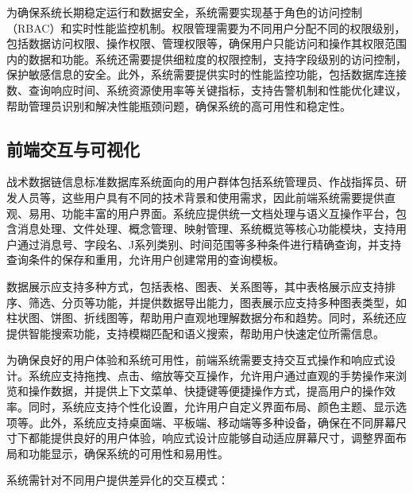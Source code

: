 为确保系统长期稳定运行和数据安全，系统需要实现基于角色的访问控制（RBAC）和实时性能监控机制。权限管理需要为不同用户分配不同的权限级别，包括数据访问权限、操作权限、管理权限等，确保用户只能访问和操作其权限范围内的数据和功能。系统还需要提供细粒度的权限控制，支持字段级别的访问控制，保护敏感信息的安全。此外，系统需要提供实时的性能监控功能，包括数据库连接数、查询响应时间、系统资源使用率等关键指标，支持告警机制和性能优化建议，帮助管理员识别和解决性能瓶颈问题，确保系统的高可用性和稳定性\cite{Lekkakos_2008}。

\subsection{前端交互与可视化}
战术数据链信息标准数据库系统面向的用户群体包括系统管理员、作战指挥员、研发人员等，这些用户具有不同的技术背景和使用需求，因此前端系统需要提供直观、易用、功能丰富的用户界面。系统应提供统一文档处理与语义互操作平台，包含消息处理、文件处理、概念管理、映射管理、系统概览等核心功能模块，支持用户通过消息号、字段名、J系列类别、时间范围等多种条件进行精确查询，并支持查询条件的保存和重用，允许用户创建常用的查询模板。

数据展示应支持多种方式，包括表格、图表、关系图等，其中表格展示应支持排序、筛选、分页等功能，并提供数据导出能力，图表展示应支持多种图表类型，如柱状图、饼图、折线图等，帮助用户直观地理解数据分布和趋势。同时，系统还应提供智能搜索功能，支持模糊匹配和语义搜索，帮助用户快速定位所需信息。

为确保良好的用户体验和系统可用性，前端系统需要支持交互式操作和响应式设计。系统应支持拖拽、点击、缩放等交互操作，允许用户通过直观的手势操作来浏览和操作数据，并提供上下文菜单、快捷键等便捷操作方式，提高用户的操作效率。同时，系统应支持个性化设置，允许用户自定义界面布局、颜色主题、显示选项等。此外，系统应支持桌面端、平板端、移动端等多种设备，确保在不同屏幕尺寸下都能提供良好的用户体验，响应式设计应能够自动适应屏幕尺寸，调整界面布局和功能显示，确保系统的可用性和易用性\cite{Ho_2008}。

系统需针对不同用户提供差异化的交互模式\cite{reid_2018_nav_leo}：

